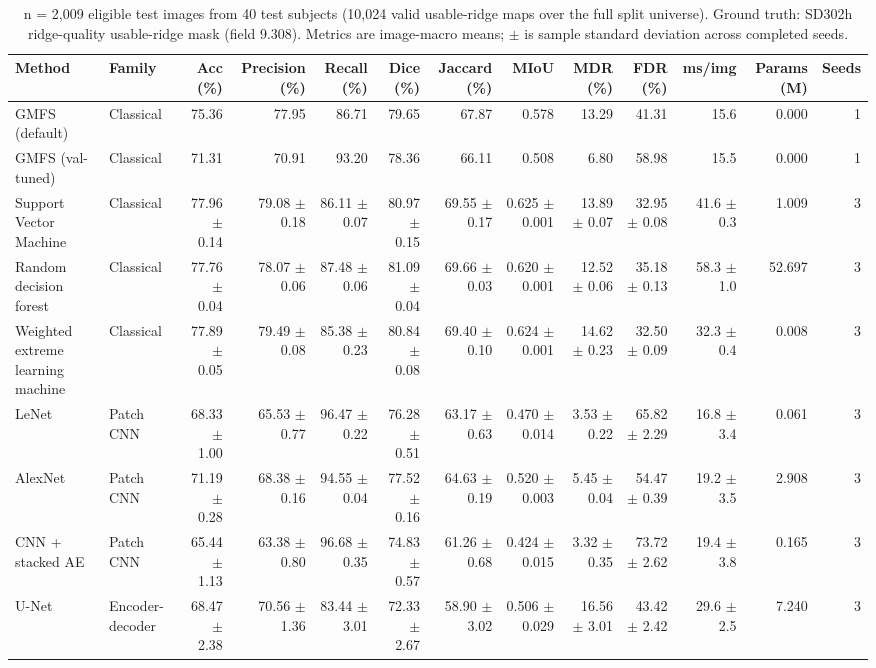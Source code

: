\begin{table}[t]
\centering
\scriptsize
\setlength{\tabcolsep}{3pt}
\caption{n = 2,009 eligible test images from 40 test subjects (10,024 valid usable-ridge maps over the full split universe). Ground truth: SD302h ridge-quality usable-ridge mask (field 9.308). Metrics are image-macro means; $\pm$ is sample standard deviation across completed seeds.}
\label{tab:sd302e-quality}
\begin{tabular}{llrrrrrrrrrrr}
\toprule
Method & Family & Acc (\%) & Precision (\%) & Recall (\%) & Dice (\%) & Jaccard (\%) & MIoU & MDR (\%) & FDR (\%) & ms/img & Params (M) & Seeds \\
\midrule
GMFS (default) & Classical & 75.36 & 77.95 & 86.71 & 79.65 & 67.87 & 0.578 & 13.29 & 41.31 & 15.6 & 0.000 & 1 \\
GMFS (val-tuned) & Classical & 71.31 & 70.91 & 93.20 & 78.36 & 66.11 & 0.508 & 6.80 & 58.98 & 15.5 & 0.000 & 1 \\
Support Vector Machine & Classical & 77.96 $\pm$ 0.14 & 79.08 $\pm$ 0.18 & 86.11 $\pm$ 0.07 & 80.97 $\pm$ 0.15 & 69.55 $\pm$ 0.17 & 0.625 $\pm$ 0.001 & 13.89 $\pm$ 0.07 & 32.95 $\pm$ 0.08 & 41.6 $\pm$ 0.3 & 1.009 & 3 \\
Random decision forest & Classical & 77.76 $\pm$ 0.04 & 78.07 $\pm$ 0.06 & 87.48 $\pm$ 0.06 & 81.09 $\pm$ 0.04 & 69.66 $\pm$ 0.03 & 0.620 $\pm$ 0.001 & 12.52 $\pm$ 0.06 & 35.18 $\pm$ 0.13 & 58.3 $\pm$ 1.0 & 52.697 & 3 \\
Weighted extreme learning machine & Classical & 77.89 $\pm$ 0.05 & 79.49 $\pm$ 0.08 & 85.38 $\pm$ 0.23 & 80.84 $\pm$ 0.08 & 69.40 $\pm$ 0.10 & 0.624 $\pm$ 0.001 & 14.62 $\pm$ 0.23 & 32.50 $\pm$ 0.09 & 32.3 $\pm$ 0.4 & 0.008 & 3 \\
LeNet & Patch CNN & 68.33 $\pm$ 1.00 & 65.53 $\pm$ 0.77 & 96.47 $\pm$ 0.22 & 76.28 $\pm$ 0.51 & 63.17 $\pm$ 0.63 & 0.470 $\pm$ 0.014 & 3.53 $\pm$ 0.22 & 65.82 $\pm$ 2.29 & 16.8 $\pm$ 3.4 & 0.061 & 3 \\
AlexNet & Patch CNN & 71.19 $\pm$ 0.28 & 68.38 $\pm$ 0.16 & 94.55 $\pm$ 0.04 & 77.52 $\pm$ 0.16 & 64.63 $\pm$ 0.19 & 0.520 $\pm$ 0.003 & 5.45 $\pm$ 0.04 & 54.47 $\pm$ 0.39 & 19.2 $\pm$ 3.5 & 2.908 & 3 \\
CNN + stacked AE & Patch CNN & 65.44 $\pm$ 1.13 & 63.38 $\pm$ 0.80 & 96.68 $\pm$ 0.35 & 74.83 $\pm$ 0.57 & 61.26 $\pm$ 0.68 & 0.424 $\pm$ 0.015 & 3.32 $\pm$ 0.35 & 73.72 $\pm$ 2.62 & 19.4 $\pm$ 3.8 & 0.165 & 3 \\
U-Net & Encoder-decoder & 68.47 $\pm$ 2.38 & 70.56 $\pm$ 1.36 & 83.44 $\pm$ 3.01 & 72.33 $\pm$ 2.67 & 58.90 $\pm$ 3.02 & 0.506 $\pm$ 0.029 & 16.56 $\pm$ 3.01 & 43.42 $\pm$ 2.42 & 29.6 $\pm$ 2.5 & 7.240 & 3 \\

\end{tabular}
\end{table}
